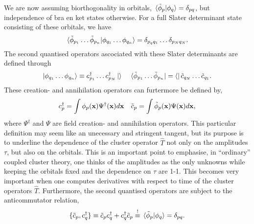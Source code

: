 We are now assuming biorthogonality in orbitals, $\braket*{\tilde{\phi}_p}{\phi_q} = \delta_{pq}$, but 
independence of bra en ket states otherwise. For a full Slater determinant state 
consisting of these orbitals, we have 
\begin{equation}
    \braket*{\tilde{\phi}_{p_1}\dots \tilde{\phi}_{p_n}}{\phi_{q_1}\dots\phi_{q_n}}
    =\delta_{p_q q_1}\dots \delta_{p_N q_N}.
\end{equation}
The second quantised operators ascociated with these Slater determinants are defined through
\begin{equation}
    \ket{\phi_{q_1}\dots\phi_{q_n}} \equiv c^\dagger_{p_1}\dots c^\dagger_{p_N}\ket{ }
    \quad
    \bra*{\tilde{\phi}_{p_1}\dots \tilde{\phi}_{p_n}} = \bra{ } \tilde{c}_{q_N} \dots \tilde{c}_{q_1}.
\end{equation}
These creation- and annihilation operators can furtermore be defined by,
\begin{equation}
    c_p^\dagger = \int \phi_p(\vb{x}) \Psi^\dagger(\vb{x})d\vb{x}
    \quad
    \tilde{c}_p = \int \tilde{\phi}_p(\vb{x}) \Psi(\vb{x})d\vb{x},
\end{equation}
where $\Psi^\dagger$ and $\Psi$ are field creation- and annihilation operators. This particular
definition may seem like an unecessary and stringent tangent, but its purpose is to underline
the dependence of the cluster operator $\hat{T}$ not only on the amplitudes
$\tau$, but also on the orbitals. This is an important point to emphasise, in ``ordinary''
coupled cluster theory, one thinks of the amplitudes as the only unknowns while keeping the 
orbitals fixed and the dependence on $\tau$ are 1-1. This becomes very important when one computes derivatives with 
respect to time of the cluster operators $\hat{T}$.
Furthermore, the second quantised operators are subject to the anticommutator relation,
\begin{equation}
    \{\tilde{c}_p, c_q^\dagger \} \equiv \tilde{c}_p c_q^\dagger + c_q^\dagger\tilde{c}_p
    \stackrel{!}{\equiv} \braket*{\tilde{\phi}_p}{\phi_q} = \delta_{pq}.
\end{equation}

